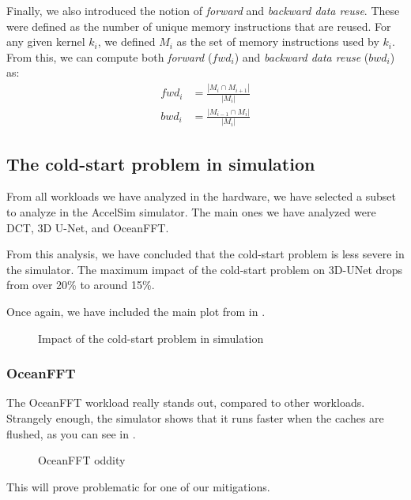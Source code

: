 Finally, we also introduced the notion of \textit{forward} and \textit{backward data reuse}.
These were defined as the number of unique memory instructions that are reused.
For any given kernel $k_i$, we defined $M_i$ as the set of memory instructions used by $k_i$.
From this, we can compute both \textit{forward} ($fwd_i$) and \textit{backward data reuse} ($bwd_i$) as:
\begin{align}
    fwd_i &= \frac{|M_i \cap M_{i+1}|}{|M_i|} \\
    bwd_i &= \frac{|M_{i-1} \cap M_i|}{|M_i|}
\end{align}

\subsection{The cold-start problem in simulation}\label{subsec:cold-start-in-simulation}
From all workloads we have analyzed in the hardware, we have selected a subset to analyze in the AccelSim simulator.
The main ones we have analyzed were DCT, 3D U-Net, and OceanFFT\@.

From this analysis, we have concluded that the cold-start problem is less severe in the simulator.
The maximum impact of the cold-start problem on 3D-UNet drops from over 20\% to around 15\%.

Once again, we have included the main plot from  in .

\begin{figure}[h]
    \centering
    \caption{Impact of the cold-start problem in simulation}
    \label{fig:concl-sim-impact}
\end{figure}

\subsubsection{OceanFFT}\label{subsubsec:oceanfft}
The OceanFFT workload really stands out, compared to other workloads.
Strangely enough, the simulator shows that it runs faster when the caches are flushed, as you can see in .

\begin{figure}[hb]
    \centering
    \caption{OceanFFT oddity}
    \label{fig:concl-ocean-odd}
\end{figure}

This will prove problematic for one of our mitigations.


